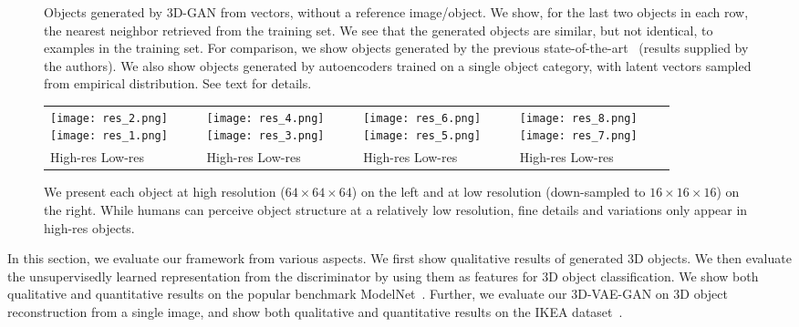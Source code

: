 \documentclass{article}
\newcommand{\model}{3D-GAN\xspace}
\newcommand{\vaemodel}{3D-VAE-GAN\xspace}
\begin{document}
\begin{figure}[t]
\caption{Objects generated by \model from vectors, without a reference image/object. We show, for the last two objects in each row, the nearest neighbor retrieved from the training set. We see that the generated objects are similar, but not identical, to examples in the training set. For comparison, we show objects generated by the previous state-of-the-art~\citep{wu20153d} (results supplied by the authors). We also show objects generated by autoencoders trained on a single object category, with latent vectors sampled from empirical distribution. See text for details. }

\label{fig:results}
\vspace{-12pt}
\end{figure}

\begin{figure}[t]
\centering
\begin{tabular}{C{0.22\linewidth}C{0.22\linewidth}C{0.22\linewidth}C{0.22\linewidth}}
\texttt{[image: res\_2.png]}
\texttt{[image: res\_1.png]}&
\texttt{[image: res\_4.png]}
\texttt{[image: res\_3.png]}&
\texttt{[image: res\_6.png]}
\texttt{[image: res\_5.png]}&
\texttt{[image: res\_8.png]}
\texttt{[image: res\_7.png]}\\
High-res \quad Low-res & High-res \quad Low-res & High-res \quad Low-res & High-res \quad Low-res 
\end{tabular}
\vspace{-5pt}
\caption{We present each object at high resolution ($64\times64\times64$) on the left and at low resolution (down-sampled to $16\times16\times16$) on the right. While humans can perceive object structure at a relatively low resolution, fine details and variations only appear in high-res objects.}
\vspace{-20pt}
\label{fig:nn}
\end{figure}

In this section, we evaluate our framework from various aspects. We first show qualitative results of generated 3D objects. We then evaluate the unsupervisedly learned representation from the discriminator by using them as features for 3D object classification. We show both qualitative and quantitative results on the popular benchmark ModelNet~\citep{wu20153d}. Further, we evaluate our \vaemodel on 3D object reconstruction from a single image, and show both qualitative and quantitative results on the IKEA dataset~\citep{ikea}. 
\end{document}
